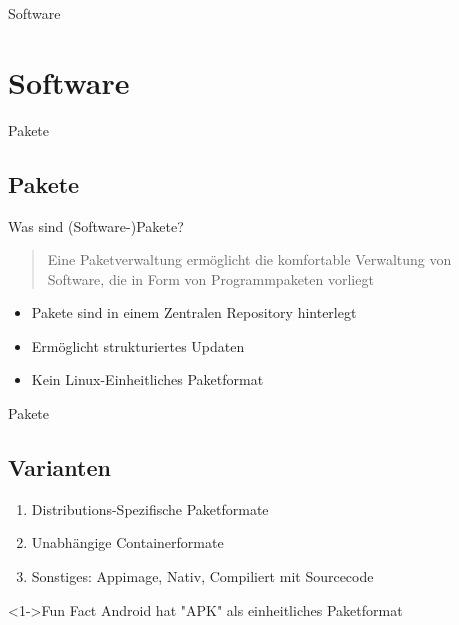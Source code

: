 
\begin{frame}{Software}
    \section{Software}\label{sec:software}
\end{frame}


\begin{frame}{Pakete}
    \subsection{Pakete}\label{subsec:pakete}

    Was sind (Software-)Pakete?

    \vspace{0.5cm}
    \begin{quote}
        Eine Paketverwaltung ermöglicht die komfortable Verwaltung von Software, die in Form von Programmpaketen vorliegt
    \end{quote}

    \begin{itemize}
        \item Pakete sind in einem Zentralen Repository hinterlegt
        \item Ermöglicht strukturiertes Updaten
        \item Kein Linux-Einheitliches Paketformat
    \end{itemize}
\end{frame}

\begin{frame}{Pakete}
    \subsection{Varianten}\label{subsec:varianten}

    \begin{enumerate}
        \item Distributions-Spezifische Paketformate
        \item Unabhängige Containerformate
        \item Sonstiges: Appimage, Nativ, Compiliert mit Sourcecode
    \end{enumerate}

    \vspace{0.5cm}
    \begin{exampleblock}<1->{Fun Fact}
        Android hat "APK" als einheitliches Paketformat
    \end{exampleblock}

\end{frame}

